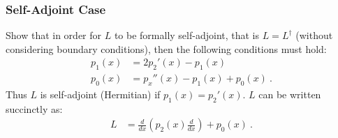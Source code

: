 \documentclass[12pt]{article}
\numberwithin{equation}{subsection}    %
\begin{document}
\subsubsection{Self-Adjoint Case}

Show that in order for $L$ to be formally self-adjoint, that is $L = L^\dag$ (without considering boundary conditions), then the following conditions must hold:
\begin{align}
	p_1(x) &= 2p_2'(x) - p_1(x) \\
	p_0(x) &= p_x''(x) - p_1(x) + p_0(x) \ .
\end{align}
Thus $L$ is self-adjoint (Hermitian) if $p_1(x) = p_2'(x)$. $L$ can be written succinctly as:
\begin{align}
	L &= \frac{d}{dx}
		\left(p_2(x)\frac{d}{dx}\right) + p_0(x) \ .
\end{align}
\end{document}

